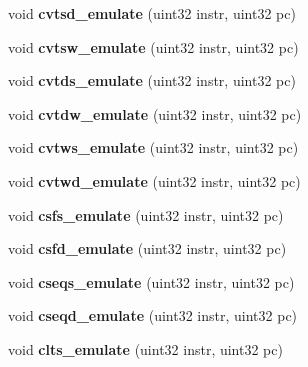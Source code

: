 \begin{DoxyCompactItemize}
\item 
\hypertarget{classFPU_a700c7159f311ed08d8bee659181852a0}{
void {\bfseries cvtsd\_\-emulate} (uint32 instr, uint32 pc)}
\label{classFPU_a700c7159f311ed08d8bee659181852a0}

\item 
\hypertarget{classFPU_a8a077ccd5ff9bd9236d89fd643fb1d85}{
void {\bfseries cvtsw\_\-emulate} (uint32 instr, uint32 pc)}
\label{classFPU_a8a077ccd5ff9bd9236d89fd643fb1d85}

\item 
\hypertarget{classFPU_a4686e932ae0345e75be19be78f882e78}{
void {\bfseries cvtds\_\-emulate} (uint32 instr, uint32 pc)}
\label{classFPU_a4686e932ae0345e75be19be78f882e78}

\item 
\hypertarget{classFPU_a2ee26225f9d1627129ed20b308eb7779}{
void {\bfseries cvtdw\_\-emulate} (uint32 instr, uint32 pc)}
\label{classFPU_a2ee26225f9d1627129ed20b308eb7779}

\item 
\hypertarget{classFPU_af0acd850a4a015b22d9122f21aab0694}{
void {\bfseries cvtws\_\-emulate} (uint32 instr, uint32 pc)}
\label{classFPU_af0acd850a4a015b22d9122f21aab0694}

\item 
\hypertarget{classFPU_aa24cb85a5d3113cf33956954acf23c5d}{
void {\bfseries cvtwd\_\-emulate} (uint32 instr, uint32 pc)}
\label{classFPU_aa24cb85a5d3113cf33956954acf23c5d}

\item 
\hypertarget{classFPU_a755d779270698baf5183494a73311601}{
void {\bfseries csfs\_\-emulate} (uint32 instr, uint32 pc)}
\label{classFPU_a755d779270698baf5183494a73311601}

\item 
\hypertarget{classFPU_a0ac2cf827201ac46cc5c6edbff77f83b}{
void {\bfseries csfd\_\-emulate} (uint32 instr, uint32 pc)}
\label{classFPU_a0ac2cf827201ac46cc5c6edbff77f83b}

\item 
\hypertarget{classFPU_a9ce1fb5bb15b767a978461e19f7a8794}{
void {\bfseries cseqs\_\-emulate} (uint32 instr, uint32 pc)}
\label{classFPU_a9ce1fb5bb15b767a978461e19f7a8794}

\item 
\hypertarget{classFPU_a57085dc91c1d644a9dd1dfa7c6235f58}{
void {\bfseries cseqd\_\-emulate} (uint32 instr, uint32 pc)}
\label{classFPU_a57085dc91c1d644a9dd1dfa7c6235f58}

\item 
\hypertarget{classFPU_a474ea0a72b3aa046deefa32fb4c7e8b2}{
void {\bfseries clts\_\-emulate} (uint32 instr, uint32 pc)}
\label{classFPU_a474ea0a72b3aa046deefa32fb4c7e8b2}


\end{DoxyCompactItemize}
